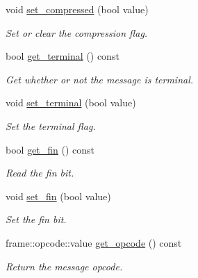 \begin{DoxyCompactItemize}
void \mbox{\hyperlink{classwebsocketpp_1_1message__buffer_1_1message_addf63a081902e981a293823606b548cb}{set\+\_\+compressed}} (bool value)
\begin{DoxyCompactList}\small\item\em Set or clear the compression flag. \end{DoxyCompactList}\item 
bool \mbox{\hyperlink{classwebsocketpp_1_1message__buffer_1_1message_a45e39497d283ec38d1360b60a5879e32}{get\+\_\+terminal}} () const
\begin{DoxyCompactList}\small\item\em Get whether or not the message is terminal. \end{DoxyCompactList}\item 
void \mbox{\hyperlink{classwebsocketpp_1_1message__buffer_1_1message_abcc812dfce52ff72f57a0d0908d33867}{set\+\_\+terminal}} (bool value)
\begin{DoxyCompactList}\small\item\em Set the terminal flag. \end{DoxyCompactList}\item 
bool \mbox{\hyperlink{classwebsocketpp_1_1message__buffer_1_1message_a8546e56c8a4c6d7f9f37510183874fba}{get\+\_\+fin}} () const
\begin{DoxyCompactList}\small\item\em Read the fin bit. \end{DoxyCompactList}\item 
void \mbox{\hyperlink{classwebsocketpp_1_1message__buffer_1_1message_ae726efab2bc95acf7a1fcd327a8e85b9}{set\+\_\+fin}} (bool value)
\begin{DoxyCompactList}\small\item\em Set the fin bit. \end{DoxyCompactList}\item 
\mbox{\label{classwebsocketpp_1_1message__buffer_1_1message_aa8f82b2e145e1d52ce4a537c3df40389}} 
frame\+::opcode\+::value \mbox{\hyperlink{classwebsocketpp_1_1message__buffer_1_1message_aa8f82b2e145e1d52ce4a537c3df40389}{get\+\_\+opcode}} () const
\begin{DoxyCompactList}\small\item\em Return the message opcode. \end{DoxyCompactList}\item 
\mbox{\label{classwebsocketpp_1_1message__buffer_1_1message_a96571972bb7dfaf1ffcae2fbedb07bbe}} 

\end{DoxyCompactItemize}
